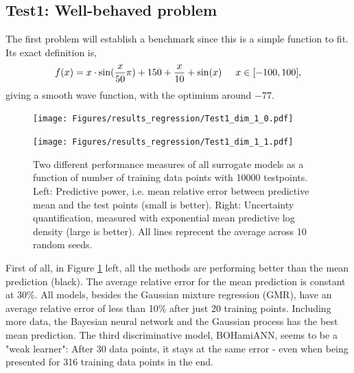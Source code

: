 
\subsection*{Test1: Well-behaved problem}
The first problem will establish a benchmark since this is a simple function to fit. Its exact definition is,
$$f(x) = x\cdot \sin(\frac{x}{50} \pi) + 150 + \frac{x}{10} + \sin(x) \hspace{0.5cm} x \in [-100,100],$$
giving a smooth wave function, with the optimium around $-77$.

\begin{figure}[bth]
  \centering
  \begin{minipage}[b]{0.49\textwidth}
   \texttt{[image: Figures/results\_regression/Test1\_dim\_1\_0.pdf]}
  \end{minipage}
  \hfill
  \begin{minipage}[b]{0.49\textwidth}
    \texttt{[image: Figures/results\_regression/Test1\_dim\_1\_1.pdf]}
   \end{minipage}
  \caption{Two different performance measures of all surrogate models as a function of number of
  training data points with 10000 testpoints. Left: Predictive power, i.e. mean relative error
  between predictive mean and the test points (small is better). Right: Uncertainty quantification, measured
  with exponential mean predictive log density (large is better). All lines reprecent the average
  across 10 random seeds.}
  \label{Test1_reg_plot}
\end{figure}

First of all, in Figure \ref{Test1_reg_plot} left, all the methods are performing better than the
mean prediction (black). The average relative error for the mean prediction is constant at 30\%. All
models, besides the Gaussian mixture regression (GMR), have an average relative error of less than
10\% after just 20 training points. Including more data, the Bayesian neural network and the
Gaussian process has the best mean prediction. The third discriminative model, BOHamiANN, seems to
be a "weak learner": After 30 data points, it stays at the same error - even when being presented
for 316 training data points in the end. 

